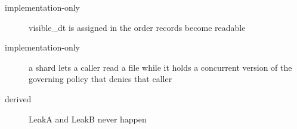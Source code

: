 \begin{description}
\item[implementation-only] visible\_dt is assigned in the order records become readable
\item[implementation-only] a shard lets a caller read a file while it holds a concurrent version of the governing policy that denies that caller
\item[derived] LeakA and LeakB never happen
\end{description}
